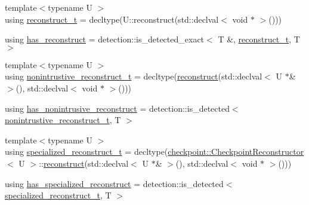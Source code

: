 \begin{DoxyCompactItemize}
\item 
{\footnotesize template$<$typename U $>$ }\\using \hyperlink{structcheckpoint_1_1_serializable_traits_a9f161977ecf1aed8a4ccd5d63768399a}{reconstruct\+\_\+t} = decltype(U\+::reconstruct(std\+::declval$<$ void $\ast$ $>$()))
\item 
using \hyperlink{structcheckpoint_1_1_serializable_traits_a1c37f2f1a317fdd0d198c3d6ad2d35c4}{has\+\_\+reconstruct} = detection\+::is\+\_\+detected\+\_\+exact$<$ T \&, \hyperlink{structcheckpoint_1_1_serializable_traits_a9f161977ecf1aed8a4ccd5d63768399a}{reconstruct\+\_\+t}, T $>$
\item 
{\footnotesize template$<$typename U $>$ }\\using \hyperlink{structcheckpoint_1_1_serializable_traits_abe5231bdf561e55fd9e0673e42a8a96c}{nonintrustive\+\_\+reconstruct\+\_\+t} = decltype(\hyperlink{namespacecheckpoint_a6254f2e220f905a2b0c797c08092a7a1}{reconstruct}(std\+::declval$<$ U $\ast$\& $>$(), std\+::declval$<$ void $\ast$ $>$()))
\item 
using \hyperlink{structcheckpoint_1_1_serializable_traits_aeaa2e5459d2910f2ed6a8e423b45552b}{has\+\_\+nonintrusive\+\_\+reconstruct} = detection\+::is\+\_\+detected$<$ \hyperlink{structcheckpoint_1_1_serializable_traits_abe5231bdf561e55fd9e0673e42a8a96c}{nonintrustive\+\_\+reconstruct\+\_\+t}, T $>$
\item 
{\footnotesize template$<$typename U $>$ }\\using \hyperlink{structcheckpoint_1_1_serializable_traits_a914c73251ad840e5370f1ac7cb1c18de}{specialized\+\_\+reconstruct\+\_\+t} = decltype(\hyperlink{structcheckpoint_1_1_checkpoint_reconstructor}{checkpoint\+::\+Checkpoint\+Reconstructor}$<$ U $>$\+::\hyperlink{namespacecheckpoint_a6254f2e220f905a2b0c797c08092a7a1}{reconstruct}(std\+::declval$<$ U $\ast$\& $>$(), std\+::declval$<$ void $\ast$ $>$()))
\item 
using \hyperlink{structcheckpoint_1_1_serializable_traits_afa7760f6127136a1772b90cbe9922bc3}{has\+\_\+specialized\+\_\+reconstruct} = detection\+::is\+\_\+detected$<$ \hyperlink{structcheckpoint_1_1_serializable_traits_a914c73251ad840e5370f1ac7cb1c18de}{specialized\+\_\+reconstruct\+\_\+t}, T $>$
\end{DoxyCompactItemize}
